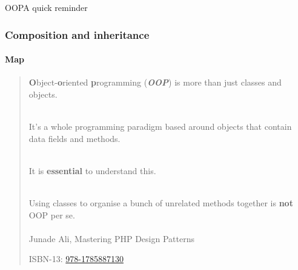 \begin{sepframe}{OOP}{A quick reminder}
\end{sepframe}

\begin{frame}[fragile,c]
    \frametitle{Composition and inheritance}
    \framesubtitle{Map}

\end{frame}

\begin{frame}
    \begin{quote}
        \textbf{O}bject-\textbf{o}riented \textbf{p}rogramming (\textbf{\textit{OOP}}) is more than just classes and objects.\\~\\\pause

        It's a whole programming paradigm based around objects that contain data fields and methods.\\~\\

        \pause

        It is \textbf{essential} to understand this.\\~\\

        \pause

        Using classes to organise a bunch of unrelated methods together is \textbf{not} OOP per se.\\~\\

        \hfill Junade Ali, Mastering PHP Design Patterns

        \hfill ISBN-13: \href{https://www.amazon.com/Mastering-PHP-Design-Patterns-Junade/dp/1785887130}{978-1785887130}
    \end{quote}
\end{frame}

